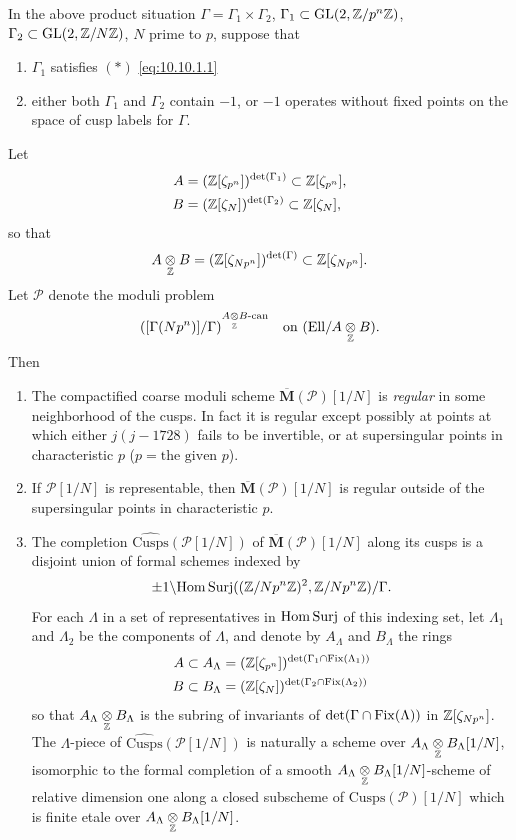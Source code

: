 \begin{kthm}\label{thm:10.10.3}
In the above product situation $\Gamma = \Gamma_1 \times \Gamma_2$, $\Gamma_1 \subset \operatorname{GL}(2, \mathbb{Z}/p^n\mathbb{Z})$, $\Gamma_2 \subset \operatorname{GL}(2, \mathbb{Z}/N\mathbb{Z})$, $N$ prime to $p$, suppose that
\begin{enumerate}[label=(\alph*)]
\item $\Gamma_1$ satisfies $(*)$ \eqref{eq:10.10.1.1}
\item either both $\Gamma_1$ and $\Gamma_2$ contain $-1$, or $-1$ operates without fixed points on the space of cusp labels for $\Gamma$.
\end{enumerate}
Let
\begin{align*}
A &= (\mathbb{Z}[\zeta_{p^n}])^{\det(\Gamma_1)} \subset \mathbb{Z}[\zeta_{p^n}] , \\
B &= (\mathbb{Z}[\zeta_N])^{\det(\Gamma_2)} \subset \mathbb{Z}[\zeta_N] ,
\end{align*}
so that
\[
A \underset{\mathbb{Z}}{\otimes} B = (\mathbb{Z}[\zeta_{Np^n}])^{\det(\Gamma)} \subset \mathbb{Z}[\zeta_{Np^n}] .
\]
Let $\mathcal{P}$ denote the moduli problem
\[
([\Gamma(Np^n)]/\Gamma)^{A \underset{\mathbb{Z}}{\otimes} B\text{-can}} \quad\text{on } (\mathrm{Ell}/A \underset{\mathbb{Z}}{\otimes} B) .
\]
Then
\begin{enumerate}[label=(\arabic*)]
\item The compactified coarse moduli scheme $\overline{\mathbf{M}}(\mathcal{P})[1/N]$ is \emph{regular} in some neighborhood of the cusps. In fact it is regular except possibly at points at which either $j(j-1728)$ fails to be invertible, or at supersingular points in characteristic $p$ ($p = \text{the given } p$).
\item If $\mathcal{P}[1/N]$ is representable, then $\overline{\mathbf{M}}(\mathcal{P})[1/N]$ is regular outside of the supersingular points in characteristic $p$.
\item The completion $\widehat{\mathrm{Cusps}}(\mathcal{P}[1/N])$ of $\overline{\mathbf{M}}(\mathcal{P})[1/N]$ along its cusps is a disjoint union of formal schemes indexed by
\[
\pm 1 \backslash \mathrm{Hom\,Surj}((\mathbb{Z}/Np^n\mathbb{Z})^2, \mathbb{Z}/Np^n\mathbb{Z})/\Gamma .
\]
For each $\Lambda$ in a set of representatives in $\mathrm{Hom\,Surj}$ of this indexing set, let $\Lambda_1$ and $\Lambda_2$ be the components of $\Lambda$, and denote by $A_\Lambda$ and $B_\Lambda$ the rings
\begin{align*}
A \subset A_\Lambda &= (\mathbb{Z}[\zeta_{p^n}])^{\det(\Gamma_1 \cap \operatorname{Fix}(\Lambda_1))} \\
B \subset B_\Lambda &= (\mathbb{Z}[\zeta_N])^{\det(\Gamma_2 \cap \operatorname{Fix}(\Lambda_2))}
\end{align*}
so that $A_\Lambda \underset{\mathbb{Z}}{\otimes} B_\Lambda$ is the subring of invariants of $\det(\Gamma \cap \operatorname{Fix}(\Lambda))$ in $\mathbb{Z}[\zeta_{Np^n}]$. The $\Lambda$-piece of $\widehat{\mathrm{Cusps}}(\mathcal{P}[1/N])$ is naturally a scheme over $A_\Lambda \underset{\mathbb{Z}}{\otimes} B_\Lambda[1/N]$, isomorphic to the formal completion of a smooth $A_\Lambda \underset{\mathbb{Z}}{\otimes} B_\Lambda[1/N]$-scheme of relative dimension one along a closed subscheme of $\mathrm{Cusps}(\mathcal{P})[1/N]$ which is finite etale over $A_\Lambda \underset{\mathbb{Z}}{\otimes} B_\Lambda[1/N]$.

\end{enumerate}
\end{kthm}
